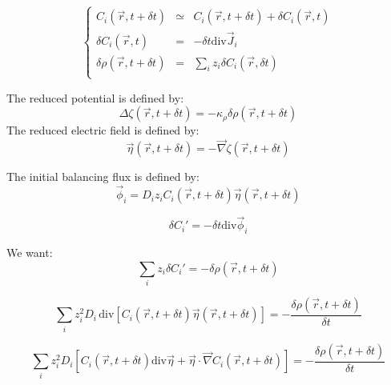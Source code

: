 \documentclass[aps,12pt]{revtex4}
\begin{document}
\begin{equation}
\left\lbrace
\begin{array}{rcl}
	C_i(\vec{r},t+\delta t) & \simeq & C_i(\vec{r},t+\delta t) + \delta C_i(\vec{r},t)\\
	\delta C_i(\vec{r},t) & = & -\delta t \mathrm{div}\vec{J}_i\\
	 \delta \rho(\vec{r},t+\delta t) & = & \sum_i z_i \delta C_i(\vec{r},\delta t)\\
\end{array}
\right.
\end{equation}

The reduced potential is defined by:
\begin{equation}
	\Delta \zeta(\vec{r},t+\delta t) = -\kappa_\rho  \delta \rho(\vec{r},t+\delta t) 
\end{equation}
The reduced electric field is defined by:
\begin{equation}
	\vec{\eta}(\vec{r},t+\delta t) = -\vec{\nabla}{\zeta}(\vec{r},t+\delta t)
 \end{equation}

The initial balancing flux is defined by:
\begin{equation}
	\vec{\phi}_i = D_i z_i C_i(\vec{r},t+\delta t) \vec{\eta}(\vec{r},t+\delta t)
\end{equation}

\begin{equation}
	\delta C_i' = - \delta t \mathrm{div} \vec{\phi}_i
\end{equation}

We want:
\begin{equation}
	\sum_i z_i \delta C_i' = -\delta\rho(\vec{r},t+\delta t)
\end{equation}

\begin{equation}
	\sum_i z_i^2 D_i \, \mathrm{div}\left[C_i(\vec{r},t+\delta t) \vec{\eta}(\vec{r},t+\delta t) \right] = -\dfrac{\delta\rho(\vec{r},t+\delta t)}{\delta t}
\end{equation}

\begin{equation}
	\sum_i z_i^2 D_i\left[ C_i(\vec{r},t+\delta t) \mathrm{div}{\vec{\eta}} + \vec{\eta} \cdot \vec{\nabla} C_i(\vec{r},t+\delta t) \right]   = -\dfrac{\delta\rho(\vec{r},t+\delta t)}{\delta t}
\end{equation}
\end{document}
